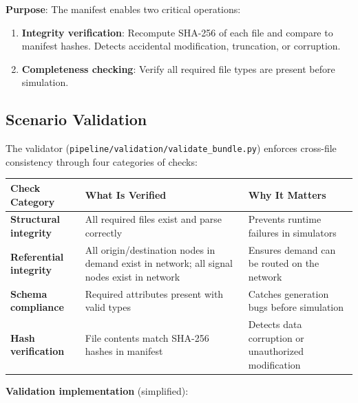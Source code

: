 \textbf{Purpose}: The manifest enables two critical operations:

\begin{enumerate}
\def\labelenumi{\arabic{enumi}.}
\tightlist
\item
  \textbf{Integrity verification}: Recompute SHA-256 of each file and
  compare to manifest hashes. Detects accidental modification,
  truncation, or corruption.
\item
  \textbf{Completeness checking}: Verify all required file types are
  present before simulation.
\end{enumerate}

\subsection{Scenario Validation}\label{328-scenario-validation}

The validator (\texttt{pipeline/validation/validate\_bundle.py})
enforces cross-file consistency through four categories of checks:

\begin{longtable}[]{@{}lll@{}}
\toprule\noalign{}
Check Category & What Is Verified & Why It Matters \\
\midrule\noalign{}
\endhead
\bottomrule\noalign{}
\endlastfoot
\textbf{Structural integrity} & All required files exist and parse
correctly & Prevents runtime failures in simulators \\
\textbf{Referential integrity} & All origin/destination nodes in demand
exist in network; all signal nodes exist in network & Ensures demand can
be routed on the network \\
\textbf{Schema compliance} & Required attributes present with valid
types & Catches generation bugs before simulation \\
\textbf{Hash verification} & File contents match SHA-256 hashes in
manifest & Detects data corruption or unauthorized modification \\
\end{longtable}

\textbf{Validation implementation} (simplified):

